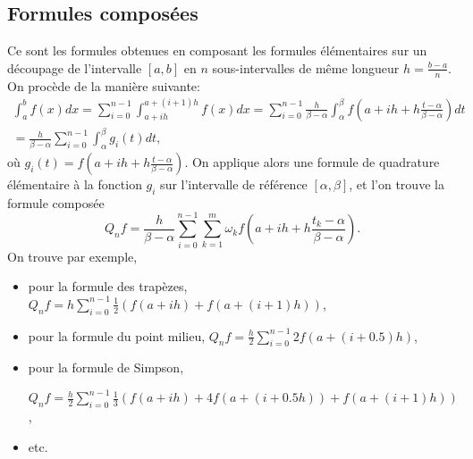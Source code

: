\documentclass[a4paper,11pt,twoside]{article}
\begin{document}
\subsection*{Formules composées}
Ce sont les formules obtenues en composant les formules élémentaires sur
un découpage de l'intervalle $[a,b]$ en $n$ sous-intervalles de même
longueur $h = \frac{b-a}n$. On procède de la manière suivante:
\begin{multline*}
  \int_a^b f(x)dx = \sum_{i=0}^{n-1} \int_{a+ih}^{a+(i+1)h} f(x)dx =
  \sum_{i=0}^{n-1} \frac{h}{\beta-\alpha} \int_\alpha^\beta f\left(
    a+ih+h\frac{t-\alpha}{\beta-\alpha} \right) dt \\ =
  \frac{h}{\beta-\alpha} \sum_{i=0}^{n-1} \int_\alpha^\beta g_i(t)dt,
\end{multline*}
où $g_i(t) = f\left( a+ih+h\frac{t-\alpha}{\beta-\alpha} \right)$. On
applique alors une formule de quadrature élémentaire à la fonction $g_i$
sur l'intervalle de référence $[\alpha,\beta]$, et l'on trouve la
formule composée
\begin{equation*}
  Q_nf = \frac{h}{\beta-\alpha} \sum_{i=0}^{n-1} \sum_{k=1}^m \omega_k
  f\left( a+ih+h\frac{t_k-\alpha}{\beta-\alpha} \right).
\end{equation*}
On trouve par exemple,
\begin{itemize}
\item pour la formule des trapèzes,
  $Q_nf = h\sum_{i=0}^{n-1} \frac12\left( f(a+ih)+f(a+(i+1)h) \right)$,
\item pour la formule du point milieu,
  $Q_nf = \frac{h}2 \sum_{i=0}^{n-1} 2f(a+(i+0.5)h)$,
\item pour la formule de Simpson,

  $Q_nf = \frac{h}2 \sum_{i=0}^{n-1} \frac13\left( f(a+ih) +
    4f(a+(i+0.5h)) + f(a+(i+1)h) \right)$,
\item etc.
\end{itemize}
\end{document}
